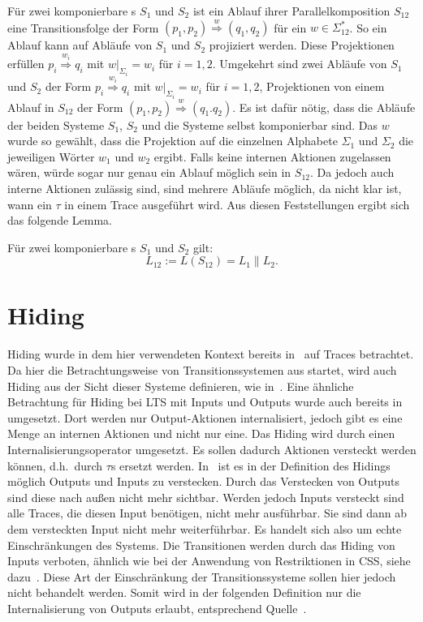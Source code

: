 Für zwei komponierbare \EIO{}s $S_1$ und $S_2$ ist ein Ablauf ihrer
Parallelkomposition $S_{12}$ eine Transitionsfolge der Form $(p_1,p_2)
\overset{w}{\Rightarrow} (q_1,q_2)$ für ein $w\in\Sigma_{12}^*$. So ein Ablauf
kann auf Abläufe von $S_1$ und $S_2$ projiziert werden. Diese Projektionen
erfüllen $p_i \overset{w_i}{\Rightarrow} q_i$ mit $w|_{\Sigma
_i}=w_i$ für $i=1,2$. Umgekehrt sind zwei Abläufe von $S_1$ und $S_2$ der Form
$p_i \overset{w_i}{\Rightarrow} q_i$ mit $w| _{\Sigma _i}= w_i$ für $i=1,2$,
Projektionen von einem Ablauf in $S_{12}$ der Form $(p_1,p_2)
\overset{w}{\Rightarrow} (q_1.q_2)$. Es ist dafür nötig, dass die Abläufe der
beiden Systeme $S_1$, $S_2$ und die Systeme selbst komponierbar sind. Das $w$ wurde so
gewählt, dass die Projektion auf die einzelnen Alphabete $\Sigma _1$ und $\Sigma
_2$ die jeweiligen Wörter $w_1$ und $w_2$ ergibt. Falls keine internen Aktionen
zugelassen wären, würde sogar nur genau ein Ablauf möglich sein in $S_{12}$. Da
jedoch auch interne Aktionen zulässig sind, sind mehrere Abläufe möglich, da
nicht klar ist, wann ein $\tau$ in einem Trace ausgeführt wird. Aus diesen
Feststellungen ergibt sich das folgende Lemma.

\begin{lem}
\label{LemmaSprache}
  Für zwei komponierbare \EIO{}s $S_1$ und $S_2$ gilt: \[L_{12} := L(S_{12}) =
  L_1\|L_2.\]
\end{lem}

\section{Hiding}

Hiding wurde in dem hier verwendeten Kontext bereits in~\cite{Chilton2013} auf
Traces betrachtet. Da hier die Betrachtungsweise von Transitionssystemen aus
startet, wird auch Hiding aus der Sicht dieser Systeme definieren, wie
in~\cite{Schlosser2012BA}. Eine ähnliche Betrachtung für Hiding bei LTS mit
Inputs und Outputs wurde auch bereits in~\cite{Lynch1996} umgesetzt. Dort
werden nur Output-Aktionen internalisiert, jedoch gibt es eine Menge an
internen Aktionen und nicht nur eine. Das Hiding wird durch einen
Internalisierungsoperator umgesetzt. Es sollen dadurch Aktionen versteckt
werden können, d.h.\ durch $\tau$s ersetzt werden. In~\cite{Chilton2013} ist es
in der Definition des Hidings möglich Outputs und Inputs zu verstecken. Durch
das Verstecken von Outputs sind diese nach außen nicht mehr sichtbar. Werden
jedoch Inputs versteckt sind alle Traces, die diesen Input benötigen, nicht
mehr ausführbar. Sie sind dann ab dem versteckten Input nicht mehr
weiterführbar. Es handelt sich also um echte Einschränkungen des Systems. Die
Transitionen werden durch das Hiding von Inputs verboten, ähnlich wie bei der Anwendung
von Restriktionen in CSS, siehe dazu~\cite{Milner1989}. Diese Art der
Einschränkung der Transitionssysteme sollen hier jedoch nicht behandelt werden.
Somit wird in der folgenden Definition nur die Internalisierung von Outputs
erlaubt, entsprechend Quelle~\cite{Schlosser2012BA}.

